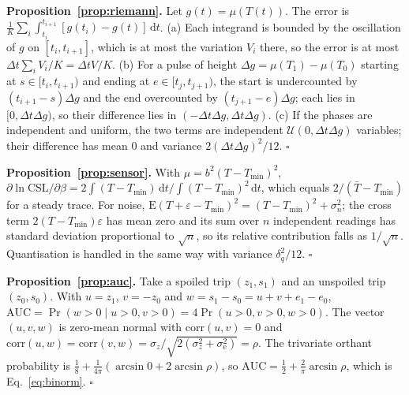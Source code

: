 \documentclass[11pt,a4paper,twoside,openany]{book}
\newcommand{\CSL}{\mathrm{CSL}}
\newcommand{\AUC}{\mathrm{AUC}}
\newcommand{\dd}{\,\mathrm{d}}
\theoremstyle{plain}\newtheorem{proposition}{Proposition}\newtheorem{corollary}{Corollary}
\theoremstyle{definition}\newtheorem{definition}{Definition}[chapter]
\begin{document}
\textbf{Proposition~\ref{prop:riemann}.} Let $g(t)=\mu(T(t))$. The error is $\frac1K\sum_i\int_{t_i}^{t_{i+1}}[g(t_i)-g(t)]\dd t$. (a) Each integrand is bounded by the oscillation of $g$ on $[t_i,t_{i+1}]$, which is at most the variation $V_i$ there, so the error is at most $\Delta t\sum_iV_i/K=\Delta tV/K$. (b) For a pulse of height $\Delta g=\mu(T_1)-\mu(T_0)$ starting at $s\in[t_i,t_{i+1})$ and ending at $e\in[t_j,t_{j+1})$, the start is undercounted by $(t_{i+1}-s)\Delta g$ and the end overcounted by $(t_{j+1}-e)\Delta g$; each lies in $[0,\Delta t\Delta g)$, so their difference lies in $(-\Delta t\Delta g,\Delta t\Delta g)$. (c) If the phases are independent and uniform, the two terms are independent $\mathcal U(0,\Delta t\Delta g)$ variables; their difference has mean 0 and variance $2(\Delta t\Delta g)^2/12$. \hfill$\square$

\textbf{Proposition~\ref{prop:sensor}.} With $\mu=b^2(T-T_{\min})^2$, $\partial\ln\CSL/\partial\beta=2\int(T-T_{\min})\dd t/\int(T-T_{\min})^2\dd t$, which equals $2/(\bar T-T_{\min})$ for a steady trace. For noise, $\mathrm E(T+\varepsilon-T_{\min})^2=(T-T_{\min})^2+\sigma_n^2$; the cross term $2(T-T_{\min})\varepsilon$ has mean zero and its sum over $n$ independent readings has standard deviation proportional to $\sqrt n$, so its relative contribution falls as $1/\sqrt n$. Quantisation is handled in the same way with variance $\delta_q^2/12$. \hfill$\square$

\textbf{Proposition~\ref{prop:auc}.} Take a spoiled trip $(z_1,s_1)$ and an unspoiled trip $(z_0,s_0)$. With $u=z_1$, $v=-z_0$ and $w=s_1-s_0=u+v+e_1-e_0$, $\AUC=\Pr(w>0\mid u>0,v>0)=4\Pr(u>0,v>0,w>0)$. The vector $(u,v,w)$ is zero-mean normal with $\mathrm{corr}(u,v)=0$ and $\mathrm{corr}(u,w)=\mathrm{corr}(v,w)=\sigma_z/\sqrt{2(\sigma_z^2+\sigma_\mathrm{e}^2)}=\rho$. The trivariate orthant probability is $\tfrac18+\tfrac{1}{4\pi}(\arcsin0+2\arcsin\rho)$, so $\AUC=\tfrac12+\tfrac{2}{\pi}\arcsin\rho$, which is Eq.~\eqref{eq:binorm}. \hfill$\square$
\end{document}
